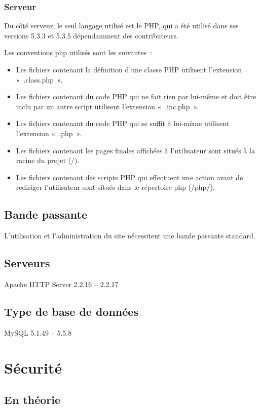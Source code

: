 \documentclass[letter, 11pt]{report}
\begin{document}
\subsubsection{Serveur}
Du côté serveur, le seul langage utilisé est le PHP, qui a été utilisé dans ses versions 5.3.3 et 5.3.5 dépendamment des contributeurs.

Les conventions php utilisés sont les suivantes~:

\begin{itemize}
	\item Les fichiers contenant la définition d'une classe PHP utilisent l'extension «~.class.php~».
	\item Les fichiers contenant du code PHP qui ne fait rien par lui-même et doit être inclu par un autre script utilisent l'extension «~.inc.php~».
	\item Les fichiers contenant du code PHP qui se suffit à lui-même utilisent l'extension «~.php~».
	\item Les fichiers contenant les pages finales affichées à l'utilisateur sont situés à la racine du projet (/).
	\item Les fichiers contenant des scripts PHP qui effectuent une action avant de rediriger l'utilisateur sont situés dans le répertoire php (/php/).
\end{itemize}

\subsection{Bande passante}
L'utilisation et l'administration du site nécessitent une bande passante standard.

\subsection{Serveurs}
Apache HTTP Server 2.2.16 -- 2.2.17

\subsection{Type de base de données}
MySQL 5.1.49 -- 5.5.8

\section{Sécurité}
\label{sec:sécurité}

\subsection{En théorie}
\end{document}
